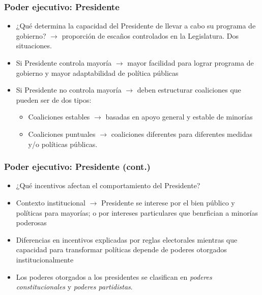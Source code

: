 \documentclass[14pt,aspectratio=169]{beamer}
\begin{document}
 \begin{frame}\frametitle{Poder ejecutivo: Presidente}
\begin{itemize}
 \item ¿Qué determina la capacidad del Presidente de llevar a cabo
      su programa de gobierno? $\longrightarrow$ proporción de escaños
      controlados en la Legislatura. Dos situaciones.
      \item Si Presidente controla mayoría $\longrightarrow$ mayor
        facilidad para lograr programa de gobierno y mayor
        adaptabilidad de política públicas
        \item Si Presidente no controla mayoría $\longrightarrow$
          deben estructurar coaliciones que pueden ser de dos tipos:
          \begin{itemize}
          \item Coaliciones estables $\longrightarrow$ basadas en
            apoyo general y estable de minorías
            \item Coaliciones puntuales $\longrightarrow$ coaliciones
              diferentes para diferentes medidas y/o políticas
              públicas. 
            \end{itemize}          
      \end{itemize}
  \end{frame}
     
\begin{frame}\frametitle{Poder ejecutivo: Presidente (cont.)}
\begin{itemize}
\item ¿Qué incentivos afectan el comportamiento del Presidente?
\item Contexto institucional $\longrightarrow$ Presidente se
  interese por el bien público y políticas para mayorías; o por
  intereses particulares que benrfician a
  minorías poderosas
  \item Diferencias en incentivos explicadas por reglas
    electorales mientras que capacidad para transformar políticas
    depende de poderes otorgados institucionalmente
    \item Los poderes otorgados a los presidentes se clasifican en
      \textit{poderes constitucionales} y \textit{poderes
        partidistas}.  
\end{itemize}
\end{frame}


 
\end{document}

